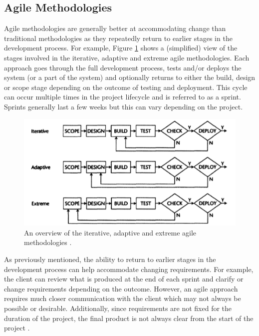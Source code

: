 \documentclass{UoYCSproject}
\begin{document}
\subsection{Agile Methodologies} \label{agile_meth}
Agile methodologies are generally better at accommodating change than traditional methodologies as they repeatedly return to earlier stages in the development process. For example, Figure \ref{fig:agile_meths} shows a (simplified) view of the stages involved in the iterative, adaptive and extreme agile methodologies. Each approach goes through the full development process, tests and/or deploys the system (or a part of the system) and optionally returns to either the build, design or scope stage depending on the outcome of testing and deployment. This cycle can occur multiple times in the project lifecycle and is referred to as a sprint. Sprints generally last a few weeks but this can vary depending on the project.

\begin{figure}[h!]
  \includegraphics[width=\linewidth]{graphics/agile_methodologies.png}
  \caption{An overview of the iterative, adaptive and extreme agile methodologies \parencite{fernandez2008agile}.}
  \label{fig:agile_meths}
\end{figure}

As previously mentioned, the ability to return to earlier stages in the development process can help accommodate changing requirements. For example, the client can review what is produced at the end of each sprint and clarify or change requirements depending on the outcome. However, an agile approach requires much closer communication with the client which may not always be possible or desirable. Additionally, since requirements are not fixed for the duration of the project, the final product is not always clear from the start of the project \parencite{fernandez2008agile}.
\end{document}
